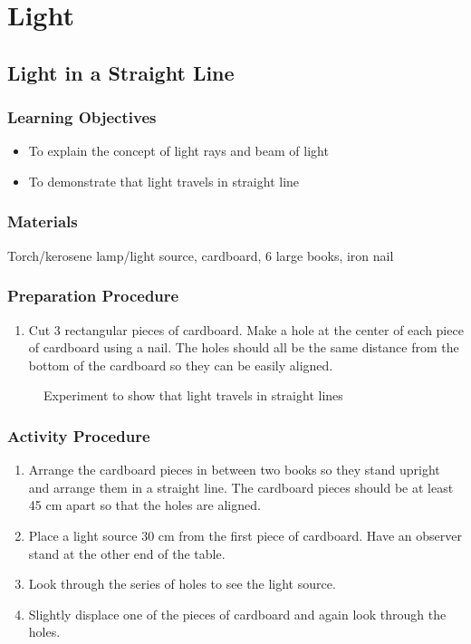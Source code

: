 \section{Light}

\subsection{Light in a Straight Line}

\subsubsection*{Learning Objectives}
\begin{itemize}
\item{To explain the concept of light rays and beam of light} 
\item{To demonstrate that light travels in straight line} 
\end{itemize}

\subsubsection*{Materials}
Torch/kerosene lamp/light source, cardboard, 6 large books, iron nail

\subsubsection*{Preparation Procedure}
\begin{enumerate}
\item{Cut 3 rectangular pieces of cardboard. Make a hole at the center of each piece of cardboard using a nail. The holes should all be the same distance from the bottom of the cardboard so they can be easily aligned.} 
\end{enumerate}

\begin{figure}[h!]
\begin{center}
\def\svgwidth{350pt}

\caption{Experiment to show that light travels in straight lines}
\label{fig:prop-of-light}
\end{center}
\end{figure}

\subsubsection*{Activity Procedure}
\begin{enumerate}
\item{Arrange the cardboard pieces in between two books so they stand upright and arrange them in a straight line. The cardboard pieces should be at least 45 cm apart so that the holes are aligned.} 
\item{Place a light source 30 cm from the first piece of cardboard. Have an observer stand at the other end of the table.} 
\item{Look through the series of holes to see the light source.}
\item{Slightly displace one of the pieces of cardboard and again look through the holes.}
\end{enumerate}

